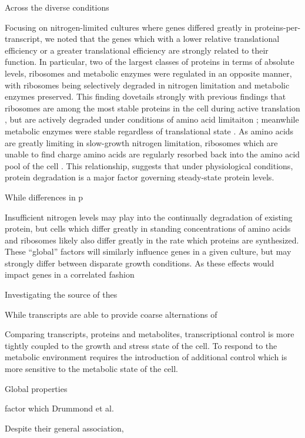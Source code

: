 Across the diverse conditions 

Focusing on nitrogen-limited cultures where genes differed greatly in proteins-per-transcript, we noted that the genes which with a lower relative translational efficiency or a greater translational efficiency are strongly related to their function.  In particular, two of the largest classes of proteins in terms of absolute levels, ribosomes and metabolic enzymes were regulated in an opposite manner, with ribosomes being selectively degraded in nitrogen limitation and metabolic enzymes preserved.  This finding dovetails strongly with previous findings that ribosomes are among the most stable proteins in the cell during active translation \cite{Belle:2006hv}, but are actively degraded under conditions of amino acid limitaiton \cite{Natarajan:2001ke, Washburn:2003ff, Zundel:2009dy}; meanwhile metabolic enzymes were stable regardless of translational state \cite{Belle:2006hv}.  As amino acids are greatly limiting in slow-growth nitrogen limitation, ribosomes which are unable to find charge amino acids are regularly resorbed back into the amino acid pool of the cell \cite{Zundel:2009dy, Xu:2013do}.  This relationship, suggests that under physiological conditions, protein degradation is a major factor governing steady-state protein levels.

While differences in p

Insufficient nitrogen levels may play into the continually degradation of existing protein, but cells which differ greatly in standing concentrations of amino acids and ribosomes likely also differ greatly in the rate which proteins are synthesized. These ``global'' factors will similarly influence genes in a given culture, but may strongly differ between disparate growth conditions.
  As these effects would impact genes in a correlated fashion \cite{Klumpp:2009ic}

Investigating the source of thes

While transcripts are able to provide coarse alternations of 

Comparing transcripts, proteins and metabolites, transcriptional control is more tightly coupled to the growth and stress state of the cell. To respond to the metabolic environment requires the introduction of additional control which is more sensitive to the metabolic state of the cell. 

Global properties

	
factor which Drummond et al. 

Despite their general association, 

